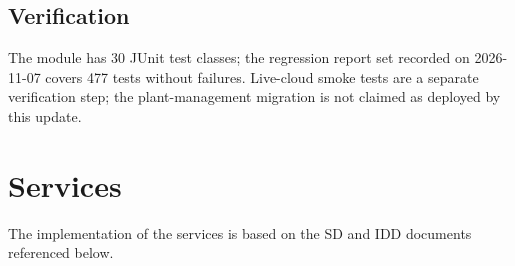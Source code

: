 \documentclass[a4paper]{arrowhead}
\begin{document}
\subsection{Verification}

The module has 30 JUnit test classes; the regression report set recorded on 2026-11-07 covers 477 tests without failures. Live-cloud smoke tests are a separate verification step; the plant-management migration is not claimed as deployed by this update.

\newpage

\section{Services}
\label{sec:services}

The implementation of the services is based on the SD and IDD documents referenced below.
\end{document}

